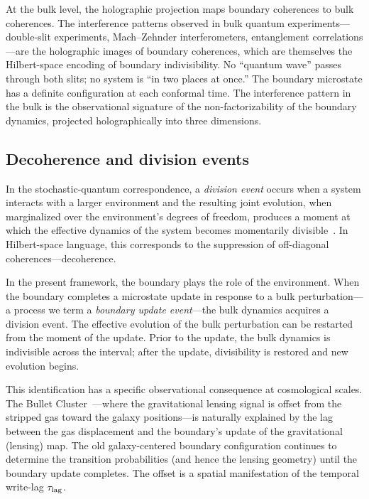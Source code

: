 \documentclass[aps,prd,twocolumn,superscriptaddress,nofootinbib]{revtex4-2}
\begin{document}
At the bulk level, the holographic projection maps boundary coherences to bulk coherences. The interference patterns observed in bulk quantum experiments---double-slit experiments, Mach--Zehnder interferometers, entanglement correlations---are the holographic images of boundary coherences, which are themselves the Hilbert-space encoding of boundary indivisibility. No ``quantum wave'' passes through both slits; no system is ``in two places at once.'' The boundary microstate has a definite configuration at each conformal time. The interference pattern in the bulk is the observational signature of the non-factorizability of the boundary dynamics, projected holographically into three dimensions.

\subsection{Decoherence and division events}

In the stochastic-quantum correspondence, a \emph{division event} occurs when a system interacts with a larger environment and the resulting joint evolution, when marginalized over the environment's degrees of freedom, produces a moment at which the effective dynamics of the system becomes momentarily divisible~\cite{Barandes2025QSIP}. In Hilbert-space language, this corresponds to the suppression of off-diagonal coherences---decoherence.

In the present framework, the boundary plays the role of the environment. When the boundary completes a microstate update in response to a bulk perturbation---a process we term a \emph{boundary update event}---the bulk dynamics acquires a division event. The effective evolution of the bulk perturbation can be restarted from the moment of the update. Prior to the update, the bulk dynamics is indivisible across the interval; after the update, divisibility is restored and new evolution begins.

This identification has a specific observational consequence at cosmological scales. The Bullet Cluster~\cite{Clowe2006}---where the gravitational lensing signal is offset from the stripped gas toward the galaxy positions---is naturally explained by the lag between the gas displacement and the boundary's update of the gravitational (lensing) map. The old galaxy-centered boundary configuration continues to determine the transition probabilities (and hence the lensing geometry) until the boundary update completes. The offset is a spatial manifestation of the temporal write-lag $\tau_{\rm lag}$.
\end{document}
